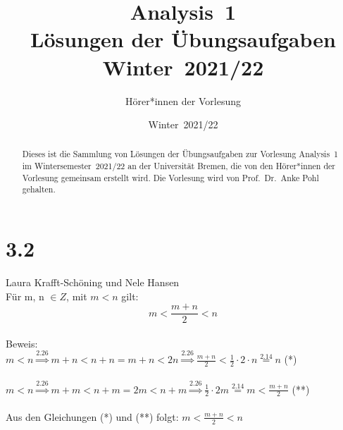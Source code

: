 \documentclass[11pt,a4paper,oneside]{amsart}
\begin{document}
\title[Analysis~1, L\"osungen]{Analysis~1 \\ L\"osungen der \"Ubungsaufgaben\\ Winter~2021/22}
\author{H\"orer*innen der Vorlesung}
\address{H\"orer*innen der Vorlesung \glqq Analysis~1\grqq{} von Prof.~Anke Pohl, Universit\"at Bremen}
\date{Winter~2021/22}


\begin{abstract}
Dieses ist die Sammlung von L\"osungen der \"Ubungsaufgaben zur Vorlesung \glqq Analysis~1\grqq{} im Wintersemester~2021/22 an der Universit\"at Bremen, die von den H\"orer*innen der Vorlesung gemeinsam erstellt wird. Die Vorlesung wird von Prof.~Dr.~Anke Pohl gehalten.
\end{abstract}


\maketitle

\tableofcontents

\newpage 

\newpage

\newpage

\newpage

\section*{3.2}
Laura Krafft-Schöning und Nele Hansen
\\

Für m, n $ \in Z$, 
mit $m < n$ gilt:
\[m<\frac{m+n}{2}<n\] 
\\ Beweis:
\\ $m<n \overset{2.26}{\Rightarrow} m+n < n+n = m+n < 2n \overset{2.26}{\Rightarrow} \frac{m+n}{2}< \frac{1}{2}\cdot 2 \cdot n \overset{2.14}{=} n $ (*)
\\
\\$ m<n\overset{2.26}{\Rightarrow} m+m < n+m = 2m < n+m \overset{2.26}{\Rightarrow} \frac{1}{2}\cdot2m \overset{2.14}{=} m < \frac{m+n}{2} $ (**)
\\
\\ Aus den Gleichungen (*) und (**) folgt: $m<\frac{m+n}{2}<n$



\newpage

\newpage

\newpage

\newpage
% 
% 
% 
% 
% 
% 
% 

\setlength{\parindent}{0pt}
\end{document}
